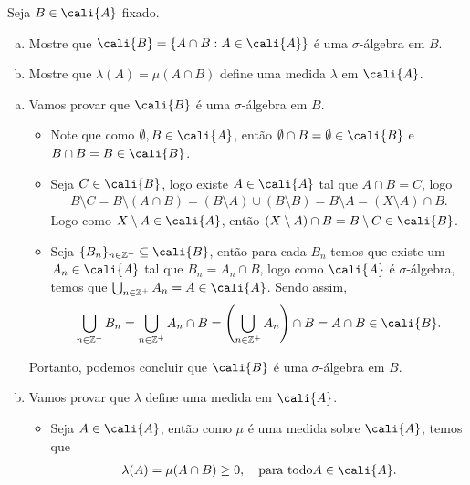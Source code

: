 \begin{homeworkProblem}[3]
  Seja $B\in\cali{A}$ fixado.
  \begin{enumerate}[a)]
    \item Mostre que $\cali{B}=\{A\cap B:A\in\cali{A}\}$ é uma $\sigma$-álgebra em $B$.
    \item Mostre que $\lambda(A)=\mu(A\cap B)$ define uma medida $\lambda$ em $\cali{A}$. 
  \end{enumerate}
  \begin{solution}
    \begin{enumerate}[a)]
      \item Vamos provar que $\cali{B}$ é uma $\sigma$-álgebra em $B$.\\
      \begin{itemize}
        \item Note que como $\emptyset,B\in\cali{A}$, então $\emptyset\cap B=\emptyset\in\cali{B}$ e $B\cap B=B\in\cali{B}$.
        \item Seja $C\in\cali{B}$, logo existe $A\in\cali{A}$ tal que $A\cap B=C$, logo
          \begin{align*}
            B\setminus C=B\setminus(A\cap B)=(B\setminus A)\cup(B\setminus B)=B\setminus A=(X\setminus A)\cap B.
          \end{align*}
          Logo como $X\setminus A\in\cali{A}$, então $(X\setminus A)\cap B=B\setminus C\in\cali{B}$.
        \item Seja $\{B_n\}_{n\in\mathbb{Z}^{+}}\subseteq\cali{B}$, então para cada $B_n$ temos que existe um $A_n\in\cali{A}$ tal que $B_n=A_n\cap B$, logo como $\cali{A}$ é $\sigma$-álgebra, temos que $\bigcup_{n\in\mathbb{Z}^{+}}A_n=A\in\cali{A}$. Sendo assim,
          \begin{align*}
            \bigcup_{n\in\mathbb{Z}^{+}}B_n=\bigcup_{n\in\mathbb{Z}^{+}}A_n\cap B=\left( \bigcup_{n\in\mathbb{Z}^{+}}A_n \right)\cap B=A\cap B\in\cali{B}.
          \end{align*}
      \end{itemize}
      Portanto, podemos concluir que $\cali{B}$ é uma $\sigma$-álgebra em $B$.
    \item Vamos provar que $\lambda$ define uma medida em $\cali{A}$.
    \begin{itemize}
      \item Seja $A\in\cali{A}$, então como $\mu$ é uma medida sobre $\cali{A}$, temos que
        \begin{align*}
          \lambda(A)=\mu(A\cap B)\geq 0,\quad\text{para todo}A\in\cali{A}.

\end{align*}
\end{itemize}
\end{enumerate}
\end{solution}
\end{homeworkProblem}
